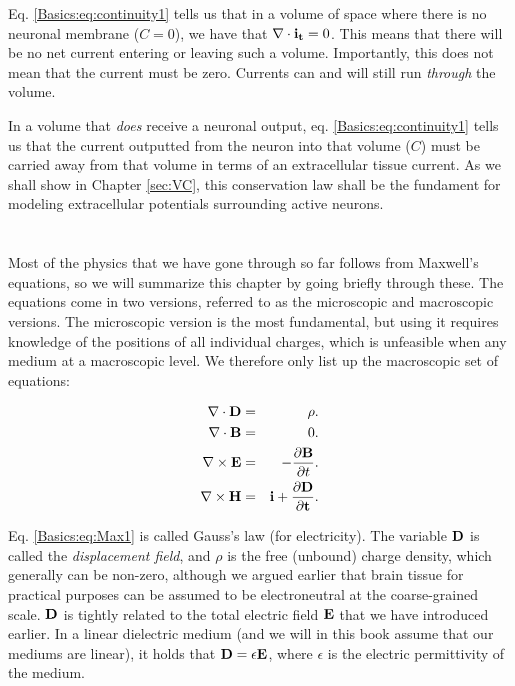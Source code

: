Eq. \ref{Basics:eq:continuity1} tells us that in a volume of space where there is no neuronal membrane ($C = 0$), we have that $\nabla \cdot {\bf i_t} = 0$. This means that there will be no net current entering or leaving such a volume. Importantly, this does not mean that the current must be zero. Currents can and will still run \textit{through} the volume.

In a volume that \textit{does} receive a neuronal output, eq. \ref{Basics:eq:continuity1} tells us that the current outputted from the neuron into that volume ($C$) must be carried away from that volume in terms of an extracellular tissue current. As we shall show in Chapter \ref{sec:VC}, this conservation law shall be the fundament for modeling extracellular potentials surrounding active neurons.


\section{}
\label{sec:Basics:Maxwell} 
Most of the physics that we have gone through so far follows from Maxwell's equations, so we will summarize this chapter by going briefly through these. The equations come in two versions, referred to as the microscopic and macroscopic versions. The microscopic version is the most fundamental, but using it requires knowledge of the positions of all individual charges, which is unfeasible when any medium at a macroscopic level. We therefore only list up the macroscopic set of equations: 

\begin{eqnarray}
\nabla\cdot {\bf D} & = & \rho. \label{Basics:eq:Max1} \\
\nabla \cdot {\bf B} & = & 0.  \label{Basics:eq:Max2} \\
\nabla \times {\bf E} & = & - \frac{\partial {\bf B}}{\partial t}.  \label{Basics:eq:Max3} \\
\nabla \times {\bf H} & = & \bf{i} + \frac{\partial {\bf D}}{\partial t}.  \label{Basics:eq:Max4}
\label{Basics:eq:Maxwell}
\end{eqnarray}

Eq. \ref{Basics:eq:Max1} is called Gauss's law (for electricity). The variable ${\bf D}$ is called the \textit{displacement field}, and $\rho$ is the free (unbound) charge density, which generally can be non-zero, although we argued earlier that brain tissue for practical purposes can be assumed to be electroneutral at the coarse-grained scale. ${\bf D}$ is tightly related to the total electric field ${\bf E}$ that we have introduced earlier. In a linear dielectric medium (and we will in this book assume that our mediums are linear), it holds that ${\bf D} = \epsilon {\bf E}$, where $\epsilon$ is the electric permittivity of the medium. 

